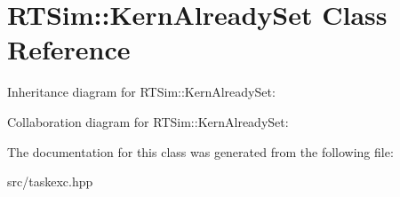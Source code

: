 \hypertarget{classRTSim_1_1KernAlreadySet}{}\section{R\+T\+Sim\+:\+:Kern\+Already\+Set Class Reference}
\label{classRTSim_1_1KernAlreadySet}


Inheritance diagram for R\+T\+Sim\+:\+:Kern\+Already\+Set\+:


Collaboration diagram for R\+T\+Sim\+:\+:Kern\+Already\+Set\+:


The documentation for this class was generated from the following file\+:\begin{DoxyCompactItemize}
\item 
src/taskexc.\+hpp\end{DoxyCompactItemize}
